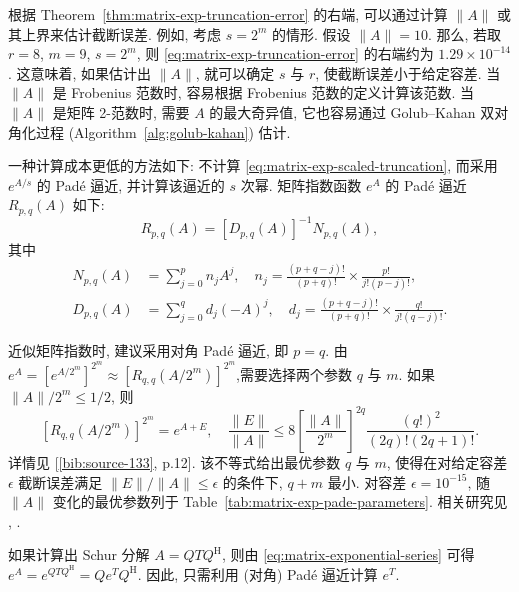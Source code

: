 {根据 Theorem~\ref{thm:matrix-exp-truncation-error} 的右端, 可以通过计算 $\|A\|$ 或其上界来估计截断误差. 例如, 考虑 $s=2^m$ 的情形. 假设 $\|A\|=10$. 那么, 若取 $r=8$, $m=9$, $s=2^m$, 则 \eqref{eq:matrix-exp-truncation-error} 的右端约为 $1.29\times10^{-14}$. 这意味着, 如果估计出 $\|A\|$, 就可以确定 $s$ 与 $r$, 使截断误差小于给定容差. 当 $\|A\|$ 是 Frobenius 范数时, 容易根据 Frobenius 范数的定义计算该范数. 当 $\|A\|$ 是矩阵 2-范数时, 需要 $A$ 的最大奇异值, 它也容易通过 Golub--Kahan 双对角化过程 (Algorithm~\ref{alg:golub-kahan}) 估计.}

{一种计算成本更低的方法如下: 不计算 \eqref{eq:matrix-exp-scaled-truncation}, 而采用 $e^{A/s}$ 的 Padé 逼近, 并计算该逼近的 $s$ 次幂. 矩阵指数函数 $e^A$ 的 Padé 逼近 $R_{p,q}(A)$ 如下:}
\begin{equation}\label{eq:matrix-exp-pade}R_{p,q}(A)=[D_{p,q}(A)]^{-1}N_{p,q}(A),\end{equation}
{其中}
\[\begin{aligned}N_{p,q}(A)&=\sum_{j=0}^p n_jA^j,\quad n_j=\frac{(p+q-j)!}{(p+q)!}\times\frac{p!}{j!(p-j)!},\\D_{p,q}(A)&=\sum_{j=0}^q d_j(-A)^j,\quad d_j=\frac{(p+q-j)!}{(p+q)!}\times\frac{q!}{j!(q-j)!}.\end{aligned}\]

{近似矩阵指数时, 建议采用对角 Padé 逼近, 即 $p=q$. 由\newline{}$e^A=[e^{A/2^m}]^{2^m}\approx[R_{q,q}(A/2^m)]^{2^m}$,\newline{}需要选择两个参数 $q$ 与 $m$. 如果 $\|A\|/2^m\le1/2$, 则}
\[[R_{q,q}(A/2^m)]^{2^m}=e^{A+E},\quad\frac{\|E\|}{\|A\|}\le8\left[\frac{\|A\|}{2^m}\right]^{2q}\frac{(q!)^2}{(2q)!(2q+1)!}.\]
{详情见 [\hyperref[bib:source-133]{\ref*{bib:source-133}}, p.12]. 该不等式给出最优参数 $q$ 与 $m$, 使得在对给定容差 $\epsilon$ 截断误差满足 $\|E\|/\|A\|\le\epsilon$ 的条件下, $q+m$ 最小. 对容差 $\epsilon=10^{-15}$, 随 $\|A\|$ 变化的最优参数列于 Table~\ref{tab:matrix-exp-pade-parameters}. 相关研究见 , .}

{如果计算出 Schur 分解 $A=QTQ^{\mathrm H}$, 则由 \eqref{eq:matrix-exponential-series} 可得 $e^A=e^{QTQ^{\mathrm H}}=Qe^TQ^{\mathrm H}$. 因此, 只需利用 (对角) Padé 逼近计算 $e^T$.}

